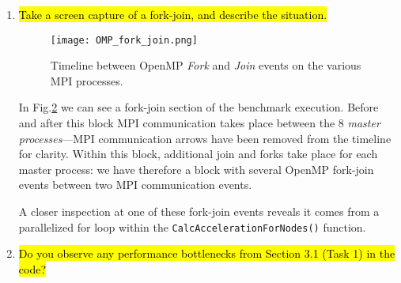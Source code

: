 \documentclass{article}
\begin{document}
\begin{enumerate}
	The Communication Matrix view highlights how each process communicates with any other process, in a fully interconnected way. However, if the metric used is \emph{Number of messages} or \emph{Aggregated message volume}, the Communication Matrix, shown in Fig.\ref{fig:commuMatrix}, appears to reveal the cube topology used for the MPI processes. Indeed the most used connection paths form a symmetric pattern---although not exactly symmetric in intensity---which suggests a \emph{neighbourhood} relationship.

	\begin{figure}[p] %
		\begin{center}
			\texttt{[image: commuMatrix.png]}
		\cprotect\caption{The \emph{hot} connections (in red and green) appear to reveal the topology used for MPI procesess (cube).}
		\label{fig:commuMatrix}
		\end{center}
	\end{figure}

	\item \hl{Take a screen capture of a fork-join, and describe the situation.} ~

	\begin{figure}[p] %
		\begin{center}
			\texttt{[image: OMP\_fork\_join.png]}
		\cprotect\caption{Timeline between OpenMP \emph{Fork} and \emph{Join} events on the various MPI processes.}
		\label{fig:ompForkJoin}
		\end{center}
	\end{figure}

	In Fig.\ref{fig:ompForkJoin} we can see a fork-join section of the benchmark execution. Before and after this block MPI communication takes place between the 8 \emph{master processes}---MPI communication arrows have been removed from the timeline for clarity. Within this block, additional join and forks take place for each master process: we have therefore a block with several OpenMP fork-join events between two MPI communication events.

	A closer inspection at one of these fork-join events reveals it comes from a parallelized for loop within the \verb!CalcAccelerationForNodes()! function.

	\item \hl{Do you observe any performance bottlenecks from Section 3.1 (Task 1) in the code?} ~


\end{enumerate}
\end{document}

